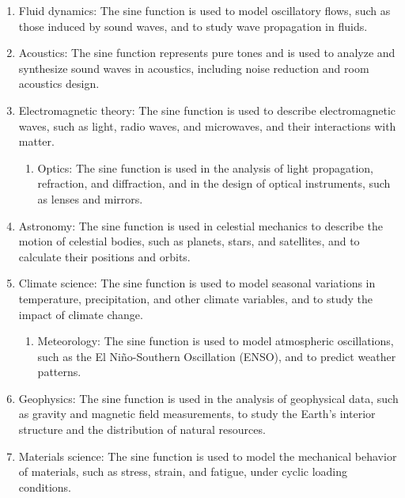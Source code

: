 \documentclass[
]{article}
\providecommand{\tightlist}{%
  \setlength{\itemsep}{0pt}\setlength{\parskip}{0pt}}
\begin{document}
\begin{enumerate}
\def\labelenumi{\arabic{enumi}.}
\item
  Fluid dynamics: The sine function is used to model oscillatory flows,
  such as those induced by sound waves, and to study wave propagation in
  fluids.
\item
  Acoustics: The sine function represents pure tones and is used to
  analyze and synthesize sound waves in acoustics, including noise
  reduction and room acoustics design.
\item
  Electromagnetic theory: The sine function is used to describe
  electromagnetic waves, such as light, radio waves, and microwaves, and
  their interactions with matter.

  \begin{enumerate}
  \def\labelenumii{\arabic{enumii}.}
  \setcounter{enumii}{3}
  \tightlist
  \item
    Optics: The sine function is used in the analysis of light
    propagation, refraction, and diffraction, and in the design of
    optical instruments, such as lenses and mirrors.
  \end{enumerate}
\item
  Astronomy: The sine function is used in celestial mechanics to
  describe the motion of celestial bodies, such as planets, stars, and
  satellites, and to calculate their positions and orbits.
\item
  Climate science: The sine function is used to model seasonal
  variations in temperature, precipitation, and other climate variables,
  and to study the impact of climate change.

  \begin{enumerate}
  \def\labelenumii{\arabic{enumii}.}
  \setcounter{enumii}{6}
  \tightlist
  \item
    Meteorology: The sine function is used to model atmospheric
    oscillations, such as the El Niño-Southern Oscillation (ENSO), and
    to predict weather patterns.
  \end{enumerate}
\item
  Geophysics: The sine function is used in the analysis of geophysical
  data, such as gravity and magnetic field measurements, to study the
  Earth's interior structure and the distribution of natural resources.
\item
  Materials science: The sine function is used to model the mechanical
  behavior of materials, such as stress, strain, and fatigue, under
  cyclic loading conditions.


\end{enumerate}
\end{document}
